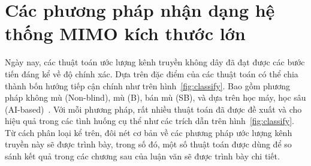 \section{Các phương pháp nhận dạng hệ thống MIMO kích thước lớn}

Ngày nay, các thuật toán ước lượng kênh truyền không dây đã đạt được các bước tiến đáng kể về độ chính xác. Dựa trên đặc điểm của các thuật toán có thể chia thành bốn hướng tiếp cận chính như trên hình~\ref{fig:classify}. Bao gồm phương pháp không mù (Non-blind), mù (B), bán mù (SB), và dựa trên học máy, học sâu (AI-based)~\cite{vilas2022}. 
Với mỗi phương pháp, rất nhiều thuật toán đã được đề xuất và cho hiệu quả trong các tình huống cụ thể như các trích dẫn trên hình~\ref{fig:classify}.
Từ cách phân loại kể trên, đôi nét cơ bản về các phương pháp ước lượng kênh truyền này sẽ được trình bày, trong số đó, một số thuật toán được dùng để so sánh kết quả trong các chương sau của luận văn sẽ được trình bày chi tiết.

